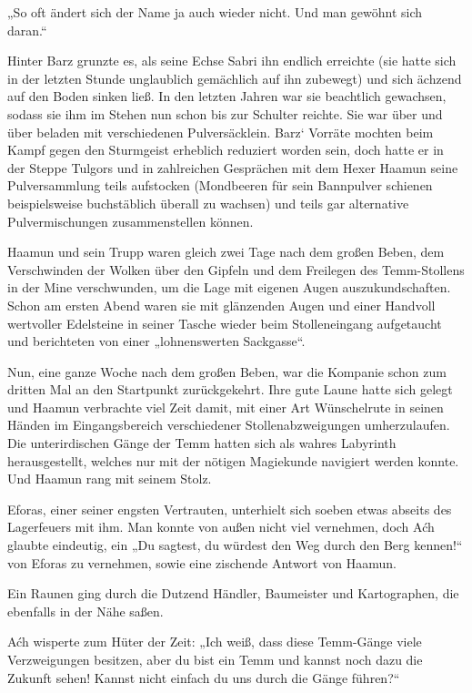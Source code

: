 „So oft ändert sich der Name ja auch wieder nicht. Und man gewöhnt sich daran.“

Hinter Barz grunzte es, als seine Echse Sabri ihn endlich erreichte (sie hatte sich in der letzten Stunde unglaublich gemächlich auf ihn zubewegt) und sich ächzend auf den Boden sinken ließ. In den letzten Jahren war sie beachtlich gewachsen, sodass sie ihm im Stehen nun schon bis zur Schulter reichte. Sie war über und über beladen mit verschiedenen Pulversäcklein. Barz‘ Vorräte mochten beim Kampf gegen den Sturmgeist erheblich reduziert worden sein, doch hatte er in der Steppe Tulgors und in zahlreichen Gesprächen mit dem Hexer Haamun seine Pulversammlung teils aufstocken (Mondbeeren für sein Bannpulver schienen beispielsweise buchstäblich überall zu wachsen) und teils gar alternative Pulvermischungen zusammenstellen können.

Haamun und sein Trupp waren gleich zwei Tage nach dem großen Beben, dem Verschwinden der Wolken über den Gipfeln und dem Freilegen des Temm-Stollens in der Mine verschwunden, um die Lage mit eigenen Augen auszukundschaften. Schon am ersten Abend waren sie mit glänzenden Augen und einer Handvoll wertvoller Edelsteine in seiner Tasche wieder beim Stolleneingang aufgetaucht und berichteten von einer „lohnenswerten Sackgasse“.

Nun, eine ganze Woche nach dem großen Beben, war die Kompanie schon zum dritten Mal an den Startpunkt zurückgekehrt. Ihre gute Laune hatte sich gelegt und Haamun verbrachte viel Zeit damit, mit einer Art Wünschelrute in seinen Händen im Eingangsbereich verschiedener Stollenabzweigungen umherzulaufen. Die unterirdischen Gänge der Temm hatten sich als wahres Labyrinth herausgestellt, welches nur mit der nötigen Magiekunde navigiert werden konnte. Und Haamun rang mit seinem Stolz.

Eforas, einer seiner engsten Vertrauten, unterhielt sich soeben etwas abseits des Lagerfeuers mit ihm. Man konnte von außen nicht viel vernehmen, doch Aćh glaubte eindeutig, ein „Du sagtest, du würdest den Weg durch den Berg kennen!“ von Eforas zu vernehmen, sowie eine zischende Antwort von Haamun.

Ein Raunen ging durch die Dutzend Händler, Baumeister und Kartographen, die ebenfalls in der Nähe saßen.

Aćh wisperte zum Hüter der Zeit: „Ich weiß, dass diese Temm-Gänge viele Verzweigungen besitzen, aber du bist ein Temm und kannst noch dazu die Zukunft sehen! Kannst nicht einfach du uns durch die Gänge führen?“

